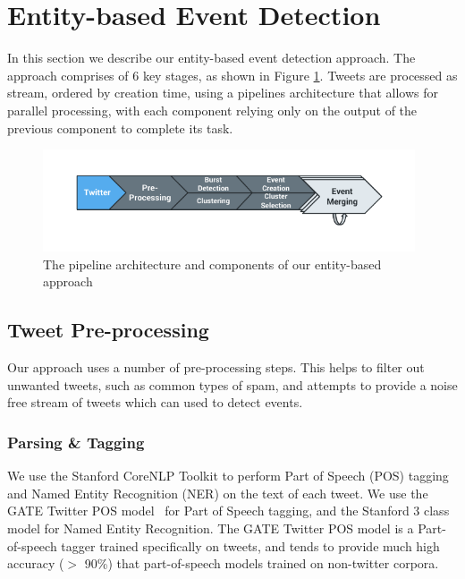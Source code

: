 
\section{Entity-based Event Detection}
\label{detection:sec:approach}
In this section we describe our entity-based event detection approach.
The approach comprises of 6 key stages, as shown in Figure \ref{detection:graphic:pipeline}.
Tweets are processed as stream, ordered by creation time, using a pipelines architecture that allows for parallel processing, with each component relying only on the output of the previous component to complete its task.

\vspace{0.5cm}
\begin{figure}[h!]
	\centering
	\includegraphics[width=11cm,trim=1.5cm 1cm 1.5cm 0.8cm]{Chapters/EntityDetection/images/system.pdf}
	\caption{The pipeline architecture and components of our entity-based approach}
	\label{detection:graphic:pipeline}
\end{figure}

\subsection{Tweet Pre-processing}
Our approach uses a number of pre-processing steps.
This helps to filter out unwanted tweets, such as common types of spam, and attempts to provide a noise free stream of tweets which can used to detect events.

\subsubsection{Parsing \& Tagging}
\label{detection:sec:parsing}
We use the Stanford CoreNLP Toolkit to perform Part of Speech (POS) tagging and Named Entity Recognition (NER) on the text of each tweet.
We  use the GATE Twitter POS model~\citep{TwitterPOS} for Part of Speech tagging, and the Stanford 3 class model for Named Entity Recognition.
The GATE Twitter POS model is a Part-of-speech tagger trained specifically on tweets, and tends to provide much high accuracy ($>$ 90\%) that part-of-speech models trained on non-twitter corpora.

